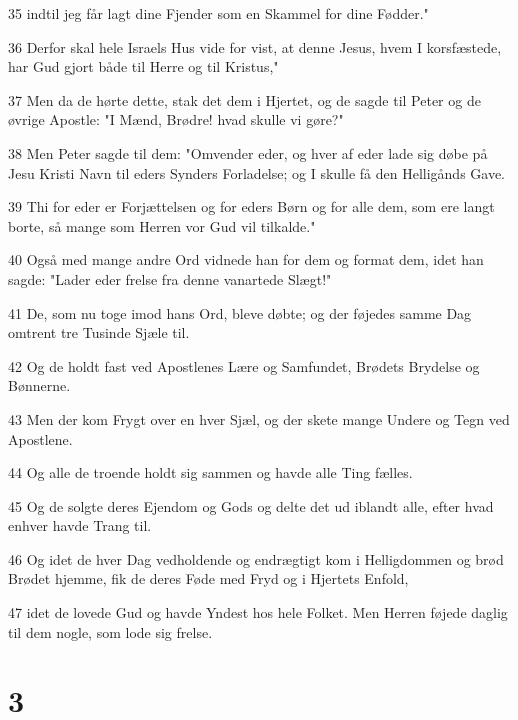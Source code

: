 \par 35 indtil jeg får lagt dine Fjender som en Skammel for dine Fødder."
\par 36 Derfor skal hele Israels Hus vide for vist, at denne Jesus, hvem I korsfæstede, har Gud gjort både til Herre og til Kristus,"
\par 37 Men da de hørte dette, stak det dem i Hjertet, og de sagde til Peter og de øvrige Apostle: "I Mænd, Brødre! hvad skulle vi gøre?"
\par 38 Men Peter sagde til dem: "Omvender eder, og hver af eder lade sig døbe på Jesu Kristi Navn til eders Synders Forladelse; og I skulle få den Helligånds Gave.
\par 39 Thi for eder er Forjættelsen og for eders Børn og for alle dem, som ere langt borte, så mange som Herren vor Gud vil tilkalde."
\par 40 Også med mange andre Ord vidnede han for dem og format dem, idet han sagde: "Lader eder frelse fra denne vanartede Slægt!"
\par 41 De, som nu toge imod hans Ord, bleve døbte; og der føjedes samme Dag omtrent tre Tusinde Sjæle til.
\par 42 Og de holdt fast ved Apostlenes Lære og Samfundet, Brødets Brydelse og Bønnerne.
\par 43 Men der kom Frygt over en hver Sjæl, og der skete mange Undere og Tegn ved Apostlene.
\par 44 Og alle de troende holdt sig sammen og havde alle Ting fælles.
\par 45 Og de solgte deres Ejendom og Gods og delte det ud iblandt alle, efter hvad enhver havde Trang til.
\par 46 Og idet de hver Dag vedholdende og endrægtigt kom i Helligdommen og brød Brødet hjemme, fik de deres Føde med Fryd og i Hjertets Enfold,
\par 47 idet de lovede Gud og havde Yndest hos hele Folket. Men Herren føjede daglig til dem nogle, som lode sig frelse.

\chapter{3}

